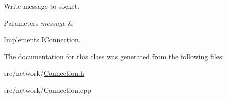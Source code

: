 Write message to socket. 


\begin{DoxyParams}{Parameters}
{\em message} & \\
\hline
\end{DoxyParams}


Implements \hyperlink{class_i_connection_a1099dbaffac0d95c3bd7ff1ed774b272}{I\-Connection}.



The documentation for this class was generated from the following files\-:\begin{DoxyCompactItemize}
\item 
src/network/\hyperlink{_connection_8h}{Connection.\-h}\item 
src/network/Connection.\-cpp\end{DoxyCompactItemize}
